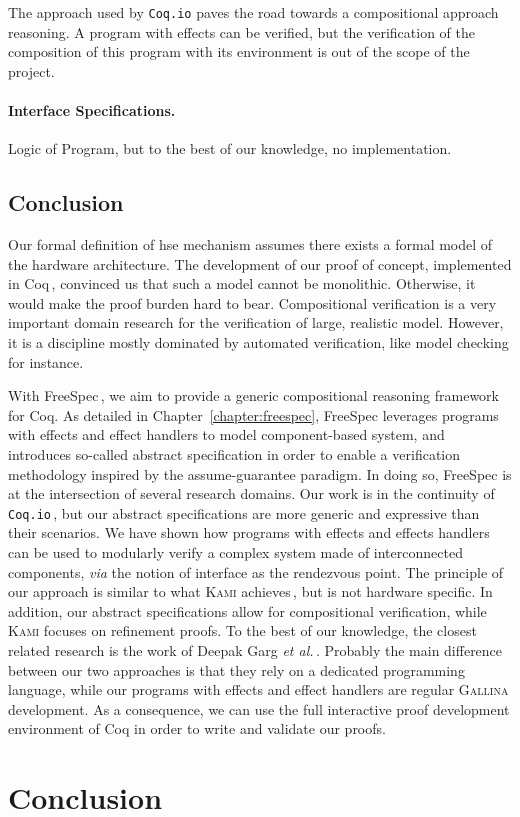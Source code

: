 The approach used by \texttt{Coq.io} paves the road towards a compositional
approach reasoning.
%
A program with effects can be verified, but the verification of the composition
of this program with its environment is out of the scope of the project.

\paragraph{Interface Specifications.}
%
Logic of Program, but to the best of our knowledge, no implementation.
%

\subsection{Conclusion}
\label{subsec:sota:compconclu}

Our formal definition of \ac{hse} mechanism assumes there exists a formal model
of the hardware architecture.
%
The development of our proof of concept, implemented in
Coq\,\cite{letan2016speccertcode}, convinced us that such a model cannot be
monolithic.
%
Otherwise, it would make the proof burden hard to bear.
%
Compositional verification is a very important domain research for the
verification of large, realistic model.
%
However, it is a discipline mostly dominated by automated verification, like
model checking for instance.

With FreeSpec\,\cite{letan2018freespeccode}, we aim to provide a generic
compositional reasoning framework for Coq.
%
As detailed in Chapter~\ref{chapter:freespec}, FreeSpec leverages programs with
effects and effect handlers to model component-based system, and introduces
so-called abstract specification in order to enable a verification methodology
inspired by the assume-guarantee paradigm.
%
In doing so, FreeSpec is at the intersection of several research domains.
%
Our work is in the continuity of \texttt{Coq.io}\,\cite{claret2015coqio}, but
our abstract specifications are more generic and expressive than their
scenarios.
%
We have shown how programs with effects and effects handlers can be used to
modularly verify a complex system made of interconnected components, \emph{via}
the notion of interface as the rendezvous point.
%
The principle of our approach is similar to what {\scshape Kami}
achieves\,\cite{choi2017kami}, but is not hardware specific.
%
In addition, our abstract specifications allow for compositional verification,
while {\scshape Kami} focuses on refinement proofs.
%
To the best of our knowledge, the closest related research is the work of Deepak
Garg \emph{et al.}\,\cite{garg2010compositional}.
%
Probably the main difference between our two approaches is that they rely on a
dedicated programming language, while our programs with effects and effect
handlers are regular {\scshape Gallina} development.
%
As a consequence, we can use the full interactive proof development environment
of Coq in order to write and validate our proofs.

\section{Conclusion}
\label{sec:sota:conclusion}
